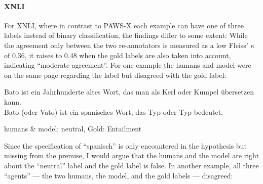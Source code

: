 {%







\paragraph*{XNLI}

For XNLI, where in contrast to PAWS-X each example can have one of three labels instead of
binary classification, the findings differ to some extent: While the agreement only between
the two re-annotators is measured as a low Fleiss' $\kappa$ of 0.36, it raises to 0.48
when the gold labels are also taken into account, indicating ``moderate agreement''. For
one example the humans and model were on the same page regarding the label but disagreed
with the gold label:



\begin{examples}
  \item Bato ist ein Jahrhunderte altes Wort, das man als Kerl oder Kumpel übersetzen kann.\\
        Bato (oder Vato) ist ein spanisches Wort, das Typ oder Typ bedeutet.

        humans \& model: neutral, Gold: Entailment
\end{examples}

Since the specification of ``spanisch'' is only encountered in the hypothesis but missing from the premise,
I would argue that the humans and the model are right about the ``neutral'' label and the gold label
is false.
In another example, all three ``agents'' --- the two humans, the model, and the gold labels --- disagreed:

}
